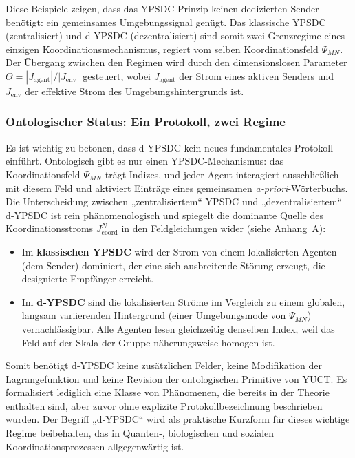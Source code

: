 \documentclass[11pt,a4paper]{article}
\begin{document}
	Diese Beispiele zeigen, dass das YPSDC-Prinzip keinen dedizierten Sender benötigt: ein gemeinsames Umgebungssignal genügt. Das klassische YPSDC (zentralisiert) und d‑YPSDC (dezentralisiert) sind somit zwei Grenzregime eines einzigen Koordinationsmechanismus, regiert vom selben Koordinationsfeld $\Psi_{MN}$. Der Übergang zwischen den Regimen wird durch den dimensionslosen Parameter $\Theta = |J_{\mathrm{agent}}|/|J_{\mathrm{env}}|$ gesteuert, wobei $J_{\mathrm{agent}}$ der Strom eines aktiven Senders und $J_{\mathrm{env}}$ der effektive Strom des Umgebungshintergrunds ist.
	
	\subsubsection*{Ontologischer Status: Ein Protokoll, zwei Regime}
	
	Es ist wichtig zu betonen, dass d‑YPSDC kein neues fundamentales Protokoll einführt.  
	Ontologisch gibt es nur einen YPSDC-Mechanismus: das Koordinationsfeld \(\Psi_{MN}\) trägt 
	Indizes, und jeder Agent interagiert ausschließlich mit diesem Feld und aktiviert Einträge eines gemeinsamen 
	\emph{a‑priori}-Wörterbuchs. Die Unterscheidung zwischen „zentralisiertem“ YPSDC und „dezentralisiertem“ 
	d‑YPSDC ist rein phänomenologisch und spiegelt die dominante Quelle des Koordinationsstroms 
	\(J^{N}_{\mathrm{coord}}\) in den Feldgleichungen wider (siehe Anhang~A):
	\begin{itemize}[leftmargin=*]
		\item Im \textbf{klassischen YPSDC} wird der Strom von einem lokalisierten Agenten (dem Sender) dominiert, 
		der eine sich ausbreitende Störung erzeugt, die designierte Empfänger erreicht.
		\item Im \textbf{d‑YPSDC} sind die lokalisierten Ströme im Vergleich zu einem globalen, langsam 
		variierenden Hintergrund (einer Umgebungsmode von \(\Psi_{MN}\)) vernachlässigbar. Alle Agenten lesen 
		gleichzeitig denselben Index, weil das Feld auf der Skala der Gruppe näherungsweise homogen ist.
	\end{itemize}
	Somit benötigt d‑YPSDC keine zusätzlichen Felder, keine Modifikation der Lagrangefunktion und keine Revision 
	der ontologischen Primitive von YUCT. Es formalisiert lediglich eine Klasse von Phänomenen, die bereits 
	in der Theorie enthalten sind, aber zuvor ohne explizite Protokollbezeichnung beschrieben wurden.  
	Der Begriff „d‑YPSDC“ wird als praktische Kurzform für dieses wichtige Regime beibehalten, das in 
	Quanten‑, biologischen und sozialen Koordinationsprozessen allgegenwärtig ist.
	
\end{document}

